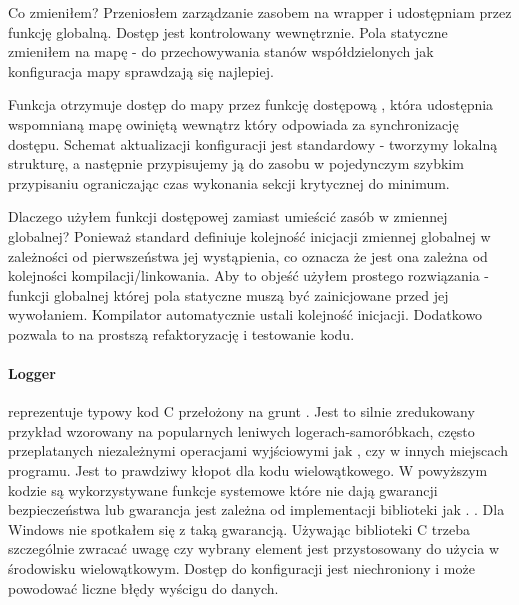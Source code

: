 Co zmieniłem?
Przeniosłem zarządzanie zasobem na wrapper  i udostępniam przez funkcję globalną. Dostęp jest kontrolowany wewnętrznie. Pola statyczne zmieniłem na mapę - do przechowywania stanów współdzielonych jak konfiguracja mapy sprawdzają się najlepiej.

Funkcja  otrzymuje dostęp do mapy przez funkcję dostępową , która udostępnia wspomnianą mapę owiniętą wewnątrz  który odpowiada za synchronizację dostępu. Schemat aktualizacji konfiguracji jest standardowy - tworzymy lokalną strukturę, a następnie przypisujemy ją do zasobu w pojedynczym szybkim przypisaniu ograniczając czas wykonania sekcji krytycznej do minimum.

Dlaczego użyłem funkcji dostępowej zamiast umieścić zasób w zmiennej globalnej?
Ponieważ standard definiuje kolejność inicjacji zmiennej globalnej w zależności od pierwszeństwa jej wystąpienia, co oznacza że jest ona zależna od kolejności kompilacji/linkowania. Aby to objeść użyłem prostego rozwiązania - funkcji globalnej której pola statyczne muszą być zainicjowane przed jej wywołaniem. Kompilator automatycznie ustali kolejność inicjacji. Dodatkowo pozwala to na prostszą refaktoryzację i testowanie kodu.

\paragraph{Logger}
 reprezentuje typowy kod C przełożony na grunt \Cpp{}. Jest to silnie zredukowany przykład wzorowany na popularnych leniwych logerach-samoróbkach, często przeplatanych niezależnymi operacjami wyjściowymi jak , czy  w innych miejscach programu. Jest to prawdziwy kłopot dla kodu wielowątkowego.
W powyższym kodzie są wykorzystywane funkcje systemowe które nie dają gwarancji bezpieczeństwa lub gwarancja jest zależna od implementacji biblioteki jak . . Dla Windows nie spotkałem się z taką gwarancją. Używając biblioteki C trzeba szczególnie zwracać uwagę czy wybrany element jest przystosowany do użycia w środowisku wielowątkowym. Dostęp do konfiguracji jest niechroniony i może powodować liczne błędy wyścigu do danych.

